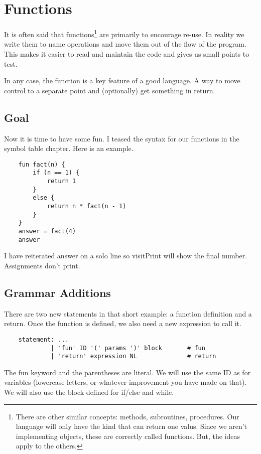 \chapter{Functions}

It is often said that functions\footnote{There are other similar
concepts: methods, subroutines, procedures. Our language will only
have the kind that can return one valus. Since we aren't implementing
objects, these are correctly called functions. But, the ideas apply
to the others.} are primarily to encourage re-use. In reality
we write them to name operations and move them out of the flow
of the program. This makes it easier to read and maintain the code
and gives us small points to test.

In any case, the function is a key feature of a good language. A way
to move control to a separate point and (optionally) get something
in return.

\section{Goal}

Now it is time to have some fun. I teased the syntax for our functions
in the symbol table chapter. Here is an example.

{\footnotesize
\begin{verbatim}
    fun fact(n) {
        if (n == 1) {
            return 1
        }
        else {
            return n * fact(n - 1)
        }
    }
    answer = fact(4)
    answer
\end{verbatim}
}

I have reiterated answer on a solo line so visitPrint will show the final
number. Assignments don't print.

\section{Grammar Additions}

There are two new statements in that short example: a function
definition and a return. Once the function is defined, we also
need a new expression to call it.

{\footnotesize
\begin{verbatim}
    statement: ...
             | 'fun' ID '(' params ')' block       # fun
             | 'return' expression NL              # return
\end{verbatim}
}

The fun keyword and the parentheses are literal. We will use
the same ID as for variables (lowercase letters, or whatever
improvement you have made on that). We will also use the block
defined for if/else and while.


